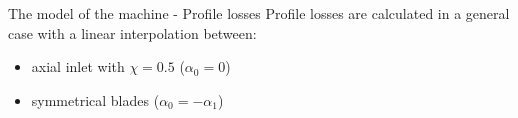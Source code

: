 \documentclass{beamer}
\begin{document}
\begin{frame}[t]{The model of the machine - Profile losses}
Profile losses are calculated in a general case with a linear interpolation between:
\begin{itemize}
	\item axial inlet with $\chi = 0.5$ ($\alpha_0 = 0$)
	\item symmetrical blades ($\alpha_0 = - \alpha_1$)
\end{itemize}
\vspace{-0.5cm}
\begin{figure}%
    \centering
    \label{fig:profile_losses}%
\end{figure}
\end{frame}
\end{document}
